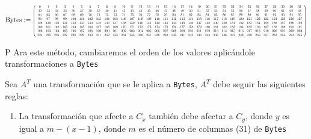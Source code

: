 \documentclass[a4paper]{article}
\newcommand*{\Scale}[2][4]{\scalebox{#1}{$#2$}}%
\begin{document}
\[
\text{Bytes} := \Scale[0.5]{
\left(
\begin{array}{cccccccccccccccccccccccccccccccc}
 0 & 1 & 2 & 3 & 4 & 5 & 6 & 7 & 8 & 9 & 10 & 11 & 12 & 13 & 14 & 15 & 16 & 17
& 18 & 19 & 20 & 21 & 22 & 23 & 24 & 25 & 26 & 27 & 28 & 29 & 30 & 31 \\
 32 & 33 & 34 & 35 & 36 & 37 & 38 & 39 & 40 & 41 & 42 & 43 & 44 & 45 & 46 & 47
& 48 & 49 & 50 & 51 & 52 & 53 & 54 & 55 & 56 & 57 & 58 & 59 & 60 & 61 & 62 & 63
\\
 64 & 65 & 66 & 67 & 68 & 69 & 70 & 71 & 72 & 73 & 74 & 75 & 76 & 77 & 78 & 79
& 80 & 81 & 82 & 83 & 84 & 85 & 86 & 87 & 88 & 89 & 90 & 91 & 92 & 93 & 94 & 95
\\
 96 & 97 & 98 & 99 & 100 & 101 & 102 & 103 & 104 & 105 & 106 & 107 & 108 & 109
& 110 & 111 & 112 & 113 & 114 & 115 & 116 & 117 & 118 & 119 & 120 & 121 & 122 &
123 & 124 & 125 & 126 & 127 \\
 128 & 129 & 130 & 131 & 132 & 133 & 134 & 135 & 136 & 137 & 138 & 139 & 140 &
141 & 142 & 143 & 144 & 145 & 146 & 147 & 148 & 149 & 150 & 151 & 152 & 153 &
154 & 155 & 156 & 157 & 158 & 159 \\
 160 & 161 & 162 & 163 & 164 & 165 & 166 & 167 & 168 & 169 & 170 & 171 & 172 &
173 & 174 & 175 & 176 & 177 & 178 & 179 & 180 & 181 & 182 & 183 & 184 & 185 &
186 & 187 & 188 & 189 & 190 & 191 \\
 192 & 193 & 194 & 195 & 196 & 197 & 198 & 199 & 200 & 201 & 202 & 203 & 204 &
205 & 206 & 207 & 208 & 209 & 210 & 211 & 212 & 213 & 214 & 215 & 216 & 217 &
218 & 219 & 220 & 221 & 222 & 223 \\
 224 & 225 & 226 & 227 & 228 & 229 & 230 & 231 & 232 & 233 & 234 & 235 & 236 &
237 & 238 & 239 & 240 & 241 & 242 & 243 & 244 & 245 & 246 & 247 & 248 & 249 &
250 & 251 & 252 & 253 & 254 & 255 \\
\end{array}
\right)
}
\]

P Ara este método, cambiaremos el orden de los valores aplicándole
transformaciones a \texttt{Bytes}

Sea $A^T$ una transformación que se le aplica a \texttt{Bytes}, $A^T$ debe
seguir
las siguientes reglas:

\begin{enumerate}
    \item La transformación que afecte a $C_x$ también debe afectar a $C_y$,
donde $y$ es igual a $m-(x-1)$\label{eq:cond1}, donde $m$ es el número de
columnas (31) de \texttt{Bytes}
\end{enumerate}
\end{document}
